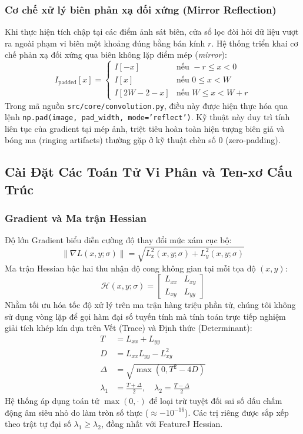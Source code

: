 \documentclass[conference]{IEEEtran}
\begin{document}
\subsubsection{Cơ chế xử lý biên phản xạ đối xứng (Mirror Reflection)}
Khi thực hiện tích chập tại các điểm ảnh sát biên, cửa sổ lọc đòi hỏi dữ liệu vượt ra ngoài phạm vi biên một khoảng đúng bằng bán kính $r$. Hệ thống triển khai cơ chế phản xạ đối xứng qua biên không lặp điểm mép (\textit{mirror}):
\begin{equation}
I_{\text{padded}}[x] = \begin{cases} 
I[-x] & \text{nếu } -r \le x < 0 \\
I[x] & \text{nếu } 0 \le x < W \\
I[2W - 2 - x] & \text{nếu } W \le x < W + r
\end{cases}
\end{equation}
Trong mã nguồn \texttt{src/core/convolution.py}, điều này được hiện thực hóa qua lệnh \texttt{np.pad(image, pad\_width, mode='reflect')}. Kỹ thuật này duy trì tính liên tục của gradient tại mép ảnh, triệt tiêu hoàn toàn hiện tượng biên giả và bóng ma (ringing artifacts) thường gặp ở kỹ thuật chèn số 0 (zero-padding).

\subsection{Cài Đặt Các Toán Tử Vi Phân và Ten-xơ Cấu Trúc}
\subsubsection{Gradient và Ma trận Hessian}
Độ lớn Gradient biểu diễn cường độ thay đổi mức xám cục bộ:
\begin{equation}
\|\nabla L(x, y; \sigma)\| = \sqrt{L_x^2(x, y; \sigma) + L_y^2(x, y; \sigma)}
\end{equation}
Ma trận Hessian bậc hai thu nhận độ cong không gian tại mỗi tọa độ $(x, y)$:
\begin{equation}
\mathcal{H}(x, y; \sigma) = \begin{bmatrix} L_{xx} & L_{xy} \\ L_{xy} & L_{yy} \end{bmatrix}
\end{equation}
Nhằm tối ưu hóa tốc độ xử lý trên ma trận hàng triệu phần tử, chúng tôi không sử dụng vòng lặp để gọi hàm đại số tuyến tính mà tính toán trực tiếp nghiệm giải tích khép kín dựa trên Vết (Trace) và Định thức (Determinant):
\begin{align}
T &= L_{xx} + L_{yy} \\
D &= L_{xx} L_{yy} - L_{xy}^2 \\
\Delta &= \sqrt{\max(0, T^2 - 4D)} \\
\lambda_1 &= \frac{T + \Delta}{2}, \quad \lambda_2 = \frac{T - \Delta}{2}
\end{align}
Hệ thống áp dụng toán tử $\max(0, \cdot)$ để loại trừ tuyệt đối sai số dấu chấm động âm siêu nhỏ do làm tròn số thực ($\approx -10^{-16}$). Các trị riêng được sắp xếp theo trật tự đại số $\lambda_1 \ge \lambda_2$, đồng nhất với FeatureJ Hessian.
\end{document}
